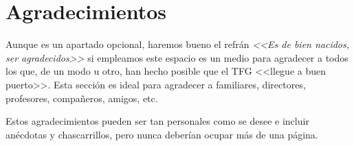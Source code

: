 \ifspanish
\else
\fi

%
%
\cleardoublepage
{} %

\chapter*{Agradecimientos} %

 Aunque es un apartado opcional, haremos bueno el refrán \emph{<<Es de bien nacidos, ser agradecidos>>} si empleamos este espacio es un medio para agradecer a todos los que, de un modo u otro, han hecho posible que el TFG <<llegue a buen puerto>>. Esta sección es ideal para agradecer a familiares, directores, profesores, compañeros, amigos, etc. 
 
 Estos agradecimientos pueden ser tan personales como se desee e incluir anécdotas y chascarrillos, pero nunca deberían ocupar más de una página.

\makeatletter		
\begin{flushright}
	\textit{\@autor}
\end{flushright}
\makeatother
